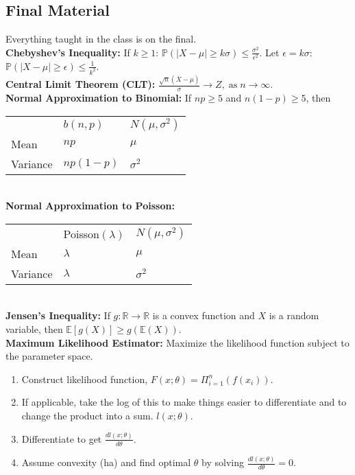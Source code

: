 \documentclass[10pt, twocolumn]{article}
\begin{document}
\subsection{Final Material}
Everything taught in the class is on the final.\\
\textbf{Chebyshev's Inequality:} If $k \geq 1$: $\mathbb{P}(|X - \mu| \geq k \sigma) \leq \frac{\sigma^2}{\epsilon^2}$. Let $\epsilon = k \sigma$: $\mathbb{P}(|X - \mu| \geq \epsilon) \leq \frac{1}{k^2}$.\\
\textbf{Central Limit Theorem (CLT):} $\frac{\sqrt{n}(\overline{X} - \mu)}{\sigma} \rightarrow Z, \;\mathrm{as}\; n \rightarrow \infty$.\\
\textbf{Normal Approximation to Binomial:} If $np \geq 5$ and $n(1-p) \geq 5$, then\\
\begin{tabular}{lll}
        & $b(n,p)$ & $N(\mu,\sigma^2)$     \\
Mean    & $np$          & $\mu$ \\
Variance& $np(1-p)$  & $\sigma^2$   
\end{tabular}\\
\textbf{Normal Approximation to Poisson:}\\
\begin{tabular}{lll}
        & Poisson$(\lambda)$ & $N(\mu,\sigma^2)$     \\
Mean    & $\lambda$          & $\mu$ \\
Variance& $\lambda$  & $\sigma^2$   
\end{tabular}\\
\textbf{Jensen's Inequality:} If $g : \mathbb{R} \rightarrow \mathbb{R}$ is a convex function and $X$ is a random variable, then $\mathbb{E}[g(X)] \geq g(\mathbb{E}(X))$.\\
\textbf{Maximum Likelihood Estimator:} Maximize the likelihood function subject to the parameter space.
\begin{enumerate}
	\item Construct likelihood function, $F(x; \theta) = \Pi_{i=1}^{n}(f(x_i))$.
	\item If applicable, take the log of this to make things easier to differentiate and to change the product into a sum. $l(x; \theta)$.
	\item Differentiate to get $\frac{dl(x;\theta)}{d\theta}$.
	\item Assume convexity (ha) and find optimal $\theta$ by solving $\frac{dl(x;\theta)}{d\theta} = 0$.
\end{enumerate}
\end{document}
